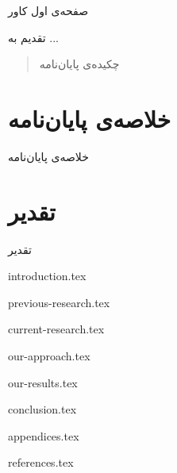 \documentclass{article}[a4paper, 11px]
\begin{document}
صفحه‌ی اول کاور

\newpage


تقدیم به ...

\newpage


\begin{abstract}
چکیده‌ی پایان‌نامه
\end{abstract}
\newpage

\section*{
خلاصه‌ی پایان‌نامه
}

خلاصه‌ی پایان‌نامه
\newpage

\section*{
تقدیر
}

تقدیر
\newpage


\tableofcontents

\newpage


\listoffigures

\newpage
 
 
\listoftables

\newpage

{introduction.tex}


{previous-research.tex}


{current-research.tex}


{our-approach.tex}



{our-results.tex}



{conclusion.tex}



{appendices.tex}




{references.tex}
\end{document}

